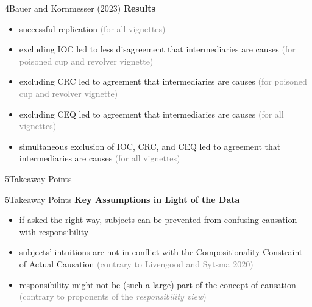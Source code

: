 \documentclass[xcolor=table,9pt,aspectratio=169]{beamer}
\begin{document}
\begin{frame}{\vspace*{10mm}4\hspace*{1em}Bauer and Kornmesser (2023)}
\vspace*{-5mm}
\textbf{Results}\\
\begin{itemize}
   \item successful replication \textcolor{gray}{(for all vignettes)}
   \item excluding IOC led to less disagreement that intermediaries are causes \textcolor{gray}{(for poisoned cup and revolver vignette)}
   \item excluding CRC led to agreement that intermediaries are causes \textcolor{gray}{(for poisoned cup and revolver vignette)}
   \item excluding CEQ led to agreement that intermediaries are causes \textcolor{gray}{(for all vignettes)}
   \item simultaneous exclusion of IOC, CRC, and CEQ led to agreement that intermediaries are causes \textcolor{gray}{(for all vignettes)}
\end{itemize}
\vfill
\end{frame}


\begin{frame}
\begin{overlayarea}{\textwidth}{0.81\paperheight}{
   \vspace*{11mm}
   \textcolor{uolblue}
   {5\hspace*{1em}Takeaway Points}
}
\end{overlayarea}
\end{frame}


\begin{frame}{\vspace*{10mm}5\hspace*{1em}Takeaway Points}
\vspace*{-5mm}
\textbf{Key Assumptions in Light of the Data}
\begin{itemize}
   \item if asked the right way, subjects can be prevented from confusing causation with responsibility
   \item subjects' intuitions are not in conflict with the Compositionality Constraint of Actual Causation \textcolor{gray}{(contrary to Livengood and Sytsma 2020)}
   \item responsibility might not be (such a large) part of the concept of causation \textcolor{gray}{(contrary to proponents of the \textit{responsibility view})}
\end{itemize}
\vfill
\end{frame}
\end{document}
